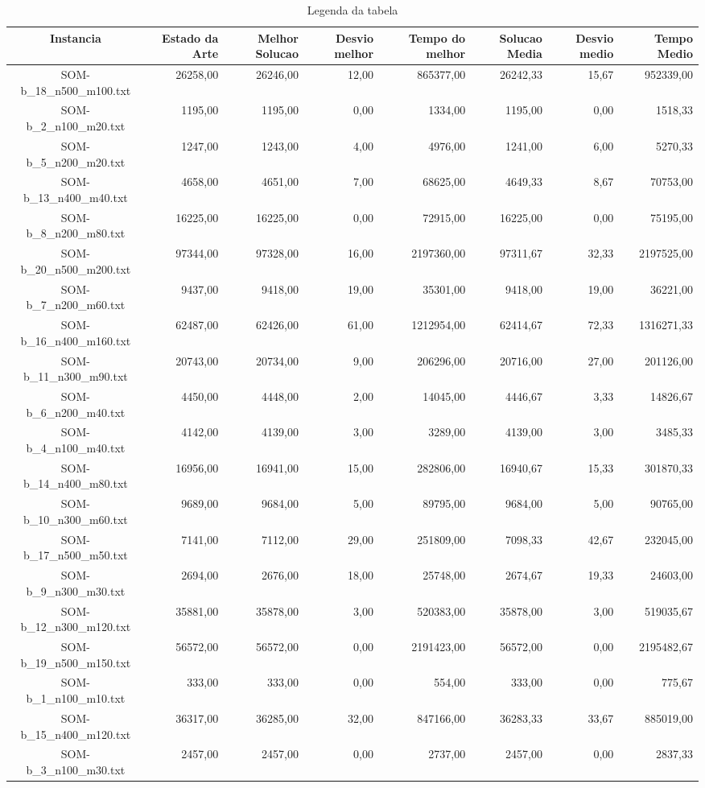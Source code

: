 \begin{landscape}
	\begin{table}[ht]
	\centering
	\begin{tabular}{| c | r | r | r | r | r | r | r |  }
\hline
Instancia&Estado da Arte&Melhor Solucao&Desvio melhor&Tempo do melhor&Solucao Media&Desvio medio&Tempo Medio\\ \hline 
		SOM-b\_18\_n500\_m100.txt&26258,00&26246,00&12,00&865377,00&26242,33&15,67&952339,00\\
		SOM-b\_2\_n100\_m20.txt&1195,00&1195,00&0,00&1334,00&1195,00&0,00&1518,33\\
		SOM-b\_5\_n200\_m20.txt&1247,00&1243,00&4,00&4976,00&1241,00&6,00&5270,33\\
		SOM-b\_13\_n400\_m40.txt&4658,00&4651,00&7,00&68625,00&4649,33&8,67&70753,00\\
		SOM-b\_8\_n200\_m80.txt&16225,00&16225,00&0,00&72915,00&16225,00&0,00&75195,00\\
		SOM-b\_20\_n500\_m200.txt&97344,00&97328,00&16,00&2197360,00&97311,67&32,33&2197525,00\\
		SOM-b\_7\_n200\_m60.txt&9437,00&9418,00&19,00&35301,00&9418,00&19,00&36221,00\\
		SOM-b\_16\_n400\_m160.txt&62487,00&62426,00&61,00&1212954,00&62414,67&72,33&1316271,33\\
		SOM-b\_11\_n300\_m90.txt&20743,00&20734,00&9,00&206296,00&20716,00&27,00&201126,00\\
		SOM-b\_6\_n200\_m40.txt&4450,00&4448,00&2,00&14045,00&4446,67&3,33&14826,67\\
		SOM-b\_4\_n100\_m40.txt&4142,00&4139,00&3,00&3289,00&4139,00&3,00&3485,33\\
		SOM-b\_14\_n400\_m80.txt&16956,00&16941,00&15,00&282806,00&16940,67&15,33&301870,33\\
		SOM-b\_10\_n300\_m60.txt&9689,00&9684,00&5,00&89795,00&9684,00&5,00&90765,00\\
		SOM-b\_17\_n500\_m50.txt&7141,00&7112,00&29,00&251809,00&7098,33&42,67&232045,00\\
		SOM-b\_9\_n300\_m30.txt&2694,00&2676,00&18,00&25748,00&2674,67&19,33&24603,00\\
		SOM-b\_12\_n300\_m120.txt&35881,00&35878,00&3,00&520383,00&35878,00&3,00&519035,67\\
		SOM-b\_19\_n500\_m150.txt&56572,00&56572,00&0,00&2191423,00&56572,00&0,00&2195482,67\\
		SOM-b\_1\_n100\_m10.txt&333,00&333,00&0,00&554,00&333,00&0,00&775,67\\
		SOM-b\_15\_n400\_m120.txt&36317,00&36285,00&32,00&847166,00&36283,33&33,67&885019,00\\
		SOM-b\_3\_n100\_m30.txt&2457,00&2457,00&0,00&2737,00&2457,00&0,00&2837,33\\
\hline
	\end{tabular}
	\caption{Legenda da tabela}
	\label{seu_label}
	\end{table}
\end{landscape}
